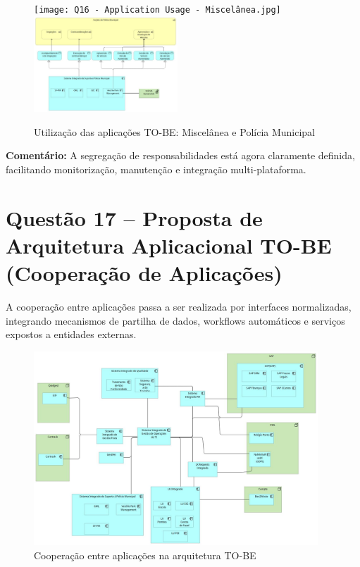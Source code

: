 \documentclass[12pt,a4paper,final]{article}
\begin{document}
    \begin{figure}[H]
        \centering
        \texttt{[image: Q16 - Application Usage - Miscelânea.jpg]}
        \includegraphics[width=0.48\textwidth]{Q16 - Application Usage - Municipal Police.jpg}
        \caption{Utilização das aplicações TO-BE: Miscelânea e Polícia Municipal}
        \label{fig:q16-usage-misc-pm}
    \end{figure}

    \textbf{Comentário:} A segregação de responsabilidades está agora claramente definida, facilitando monitorização, manutenção e integração multi-plataforma.

    \section*{Questão 17 – Proposta de Arquitetura Aplicacional TO-BE (Cooperação de Aplicações)}

    A cooperação entre aplicações passa a ser realizada por interfaces normalizadas, integrando mecanismos de partilha de dados, workflows automáticos e serviços expostos a entidades externas.

    \begin{figure}[H]
        \centering
        \includegraphics[width=0.95\textwidth]{Q17 - Application Cooperation.jpg}
        \caption{Cooperação entre aplicações na arquitetura TO-BE}
        \label{fig:q17-app-cooperation}
    \end{figure}
\end{document}
